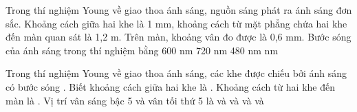 \begin{vidu}%
 Trong thí nghiệm Young về giao thoa ánh sáng, nguồn sáng phát ra ánh sáng đơn sắc. Khoảng cách giữa hai khe là 1 mm, khoảng cách từ mặt phẳng chứa hai khe đến màn quan sát là 1,2 m. Trên màn, khoảng vân đo được là 0,6 mm. Bước sóng của ánh sáng trong thí nghiệm bằng
\choice
{600 nm}
{720 nm}
{480 nm}
{ nm}
\end{vidu} 
\begin{vidu}%
Trong thí nghiệm Young về giao thoa ánh sáng, các khe  được chiếu bởi ánh sáng có bước sóng . Biết khoảng cách giữa hai khe là . Khoảng cách từ hai khe đến màn là . Vị trí vân sáng bậc 5 và vân tối thứ 5 là
\choice
{ và }
{ và }
{ và }
{\True {} và }
\end{vidu} 

